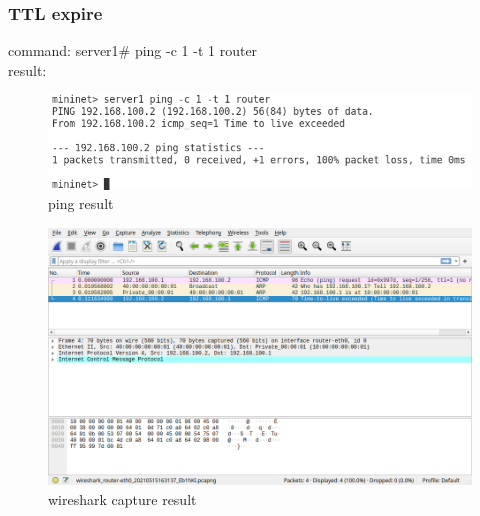 \documentclass[12pt,a4paper,UTF8]{article}
\begin{document}
\subsubsection{TTL expire}
command: server1\# ping -c 1 -t 1 router \\
result:
\begin{figure}[htbp]
	\centering
	\includegraphics[width=\textwidth]{5}
	\caption{ping result}
\end{figure}
\begin{figure}[htbp]
	\centering
	\includegraphics[width=\textwidth]{6}
	\caption{wireshark capture result}
\end{figure}

\newpage
\end{document}
